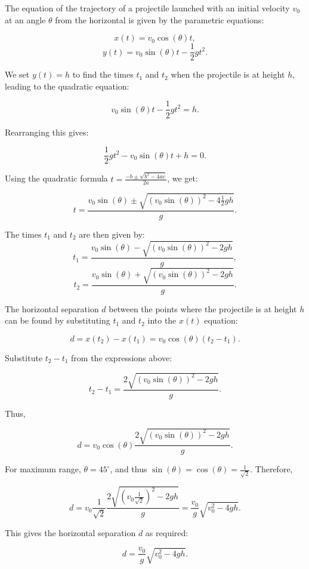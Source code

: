 \begin{solution}{6.56}
The equation of the trajectory of a projectile launched with an initial velocity \(v_0\) at an angle \(\theta\) from the horizontal is given by the parametric equations:

\[
x(t) = v_0 \cos(\theta) t,
\]
\[
y(t) = v_0 \sin(\theta) t - \frac{1}{2} g t^2.
\]

We set \(y(t) = h\) to find the times \(t_1\) and \(t_2\) when the projectile is at height \(h\), leading to the quadratic equation:

\[
v_0 \sin(\theta) t - \frac{1}{2} g t^2 = h.
\]

Rearranging this gives:

\[
\frac{1}{2} g t^2 - v_0 \sin(\theta) t + h = 0.
\]

Using the quadratic formula \(t = \frac{-b \pm \sqrt{b^2 - 4ac}}{2a}\), we get:

\[
t = \frac{v_0 \sin(\theta) \pm \sqrt{(v_0 \sin(\theta))^2 - 4 \frac{1}{2} g h}}{g}.
\]

The times \(t_1\) and \(t_2\) are then given by:
\[
t_1 = \frac{v_0 \sin(\theta) - \sqrt{(v_0 \sin(\theta))^2 - 2 g h}}{g},
\]
\[
t_2 = \frac{v_0 \sin(\theta) + \sqrt{(v_0 \sin(\theta))^2 - 2 g h}}{g}.
\]

The horizontal separation \(d\) between the points where the projectile is at height \(h\) can be found by substituting \(t_1\) and \(t_2\) into the \(x(t)\) equation:

\[
d = x(t_2) - x(t_1) = v_0 \cos(\theta) (t_2 - t_1).
\]

Substitute \(t_2 - t_1\) from the expressions above:

\[
t_2 - t_1 = \frac{2 \sqrt{(v_0 \sin(\theta))^2 - 2 g h}}{g}.
\]

Thus,

\[
d = v_0 \cos(\theta) \frac{2 \sqrt{(v_0 \sin(\theta))^2 - 2 g h}}{g}.
\]

For maximum range, \(\theta = 45^\circ\), and thus \(\sin(\theta) = \cos(\theta) = \frac{1}{\sqrt{2}}\). Therefore,

\[
d = v_0 \frac{1}{\sqrt{2}} \frac{2 \sqrt{(v_0 \frac{1}{\sqrt{2}})^2 - 2 g h}}{g} = \frac{v_0}{g} \sqrt{v_0^2 - 4 g h}.
\]

This gives the horizontal separation \(d\) as required:

\[
d = \frac{v_0}{g} \sqrt{v_0^2 - 4 g h}.
\]
\end{solution}